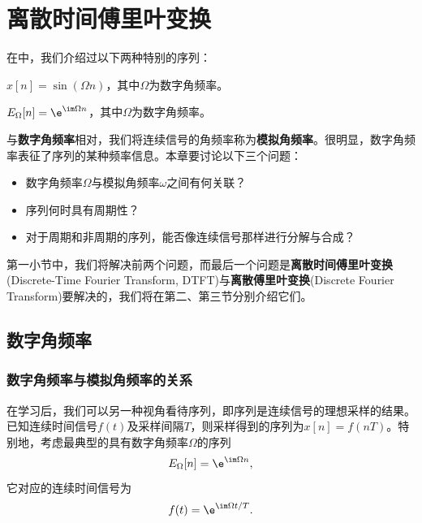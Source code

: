 \section{离散时间傅里叶变换}\label{sec:DTFT}

在中，我们介绍过以下两种特别的序列：

\begin{definition}[正弦序列]
    $x[n]=\sin(\Omega n)$，其中$\Omega$为数字角频率。
\end{definition}
\begin{definition}[复指数序列]
    $E_{\Omega}[n]=\e^{\im\Omega n}$，其中$\Omega$为数字角频率。
\end{definition}

与\textbf{数字角频率}相对，我们将连续信号的角频率称为\textbf{模拟角频率}。很明显，数字角频率表征了序列的某种频率信息。本章要讨论以下三个问题：
\begin{itemize}
    \item 数字角频率$\Omega$与模拟角频率$\omega$之间有何关联？
    \item 序列何时具有周期性？
    \item 对于周期和非周期的序列，能否像连续信号那样进行分解与合成？
\end{itemize}

第一小节中，我们将解决前两个问题，而最后一个问题是\textbf{离散时间傅里叶变换}(Discrete-Time Fourier Transform, DTFT)与\textbf{离散傅里叶变换}(Discrete Fourier Transform)要解决的，我们将在第二、第三节分别介绍它们。

\subsection{数字角频率}\label{sub:digital_freq}

\subsubsection{数字角频率与模拟角频率的关系}

在学习后，我们可以另一种视角看待序列，即序列是连续信号的理想采样的结果。已知连续时间信号$f(t)$及采样间隔$T$，则采样得到的序列为$x[n]=f(nT)$。特别地，考虑最典型的具有数字角频率$\Omega$的序列
\begin{equation}
    E_{\Omega}[n]=\e^{\im\Omega n},
\end{equation}
它对应的连续时间信号为
\begin{equation}
    f(t)=\e^{\im\Omega t/T}.
\end{equation}

